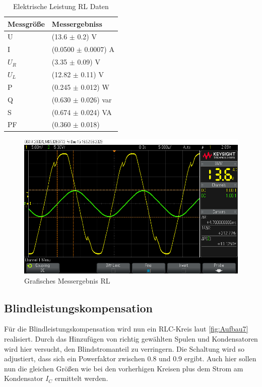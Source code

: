 \documentclass[12pt,a4paper,twoside]{article}
\begin{document}
\begin{table}[H]
    \centering
    \caption{Elektrische Leistung RL Daten}
    \label{tab:Daten6}
    \begin{tabular}{| l | l |}
        \hline
        Messgröße & Messergebniss \\
        \hline
        U & (13.6 $\pm$ 0.2) V \\
        I & (0.0500 $\pm$ 0.0007) A \\
        $U_{R}$ & (3.35 $\pm$ 0.09) V \\
        $U_{L}$ & (12.82 $\pm$ 0.11) V \\
        P & (0.245 $\pm$ 0.012) W \\
        Q & (0.630 $\pm$ 0.026) var \\
        S & (0.674 $\pm$ 0.024) VA \\
        PF & (0.360 $\pm$ 0.018) \\
        \hline
    \end{tabular}
\end{table}

\begin{figure}[H]
    \centering
    \includegraphics[width=0.6\linewidth]{nudes/PhaseLeistung/Aufgabe6/scope_11.png}
    \caption{Grafisches Messergebnis RL}
    \label{fig:MessergebnisGrafischRL}
\end{figure}



\subsection{Blindleistungskompensation}

Für die Blindleistungskompensation wird nun ein RLC-Kreis laut \ref{fig:Aufbau7} realisiert. Durch das Hinzufügen von richtig gewählten Spulen und Kondensatoren wird hier versucht, den Blindstromanteil zu verringern.
Die Schaltung wird so adjustiert, dass sich ein Powerfaktor zwischen 0.8 und 0.9 ergibt. Auch hier sollen nun die gleichen Größen wie bei den vorherhigen Kreisen plus dem Strom am Kondensator $I_{C}$ ermittelt werden.
\end{document}
